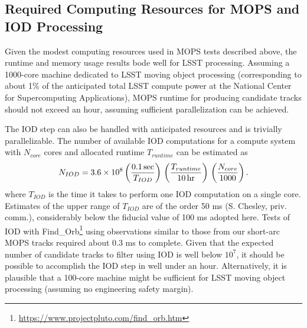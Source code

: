 \subsection{Required Computing Resources for MOPS and IOD Processing}

Given the modest computing resources used in MOPS tests described above, the runtime and memory
usage results bode well for LSST processing. Assuming a 1000-core machine dedicated to LSST moving
object processing (corresponding to about 1\% of the anticipated total LSST compute power at the
National Center for Supercomputing Applications), MOPS runtime for producing
candidate tracks should not exceed an hour, assuming sufficient parallelization can be achieved.

The IOD step can also be handled with anticipated resources and is trivially parallelizable. The number 
of available IOD computations for a compute system with $N_{core}$ cores and allocated runtime $T_{runtime}$ 
can be estimated as
\begin{equation}
  N_{IOD} = 3.6\times10^8 \left({ 0.1\,{\rm sec} \over T_{IOD}}\right) \,
                                         \left({ T_{runtime}  \over 10\,{\rm hr} }\right) \,
                                         \left({ N_{core}  \over 1000}\right).
\end{equation}
where $T_{IOD}$ is the time it takes to perform one IOD computation on a single core. Estimates
of the upper range of $T_{IOD}$ are of the order 50 ms (S. Chesley, priv. comm.), considerably below the fiducial
value of 100 ms adopted here. Tests of IOD with 
Find_Orb\footnote{\url{https://www.projectpluto.com/find_orb.htm}} using observations similar to
those from our short-arc MOPS tracks required about 0.3 ms to complete.
Given that the expected number of candidate tracks to filter using
IOD is well below $10^7$, it should be possible to accomplish the IOD step in well under an hour.
Alternatively, it is plausible that a 100-core machine might be sufficient for LSST moving object
processing (assuming no engineering safety margin).

